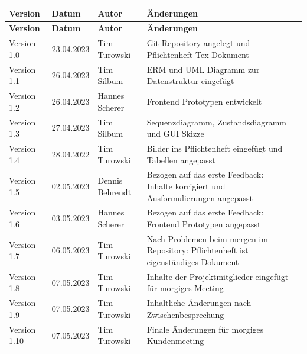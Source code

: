 \begin{flushleft}
		\begin{longtable}{p{}p{2cm}p{3cm}p{}c}
            \toprule
            \textbf{Version} & \textbf{Datum} & \textbf{Autor} & \textbf{Änderungen}\\
            \midrule\endfirsthead
            \toprule
            \textbf{Version} & \textbf{Datum} & \textbf{Autor} & \textbf{Änderungen}\\
            \midrule\endhead
            	Version 1.0 & 23.04.2023 & Tim Turowski & Git-Repository angelegt und Pflichtenheft Tex-Dokument \\ \midrule
				Version 1.1 & 26.04.2023 & Tim Silbum & ERM und UML Diagramm zur Datenstruktur eingefügt \\ \midrule
				Version 1.2 & 26.04.2023 & Hannes Scherer & Frontend Prototypen entwickelt \\ \midrule
				Version 1.3 & 27.04.2023 & Tim Silbum & Sequenzdiagramm, Zustandsdiagramm und GUI Skizze \\ \midrule
 				Version 1.4 & 28.04.2022 & Tim Turowski & Bilder ins Pflichtenheft eingefügt und Tabellen angepasst \\ \midrule
				Version 1.5 & 02.05.2023 & Dennis Behrendt & Bezogen auf das erste Feedback: Inhalte korrigiert und Ausformulierungen angepasst \\ \midrule
				Version 1.6 & 03.05.2023 & Hannes Scherer & Bezogen auf das erste Feedback: Frontend Prototypen angepasst \\ \midrule
				Version 1.7 & 06.05.2023 & Tim Turowski & Nach Problemen beim mergen im Repository: Pflichtenheft ist eigenständiges Dokument \\ \midrule
				Version 1.8 & 07.05.2023 & Tim Turowski & Inhalte der Projektmitglieder eingefügt für morgiges Meeting \\ \midrule
				Version 1.9 & 07.05.2023 & Tim Turowski & Inhaltliche Änderungen nach Zwischenbesprechung \\ \midrule
				Version 1.10 & 07.05.2023 & Tim Turowski & Finale Änderungen für morgiges Kundenmeeting \\ 
            \bottomrule
    \end{longtable}

\end{flushleft}

\newpage

\tableofcontents

\newpage


